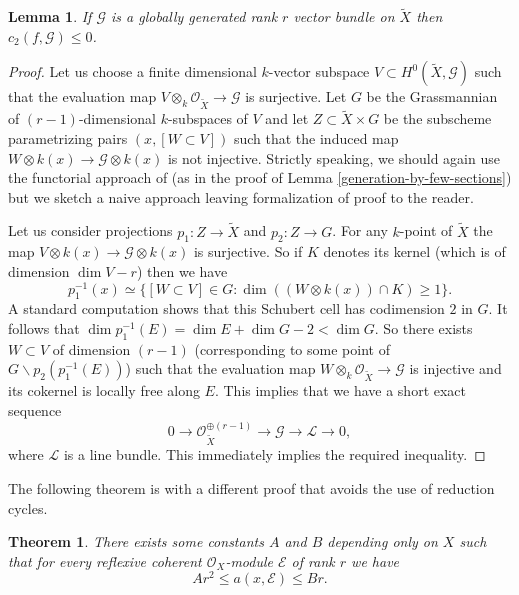 \documentclass[twoside, 11pt]{article}
\theoremstyle{plain}
\newtheorem{Theorem}[Thm]{\sc Theorem}
\newtheorem{Lemma}[Thm]{\sc Lemma}
\theoremstyle{definition}
\theoremstyle{remark}
\newcommand{\cE}{{\mathcal E}}
\newcommand{\cG}{{\mathcal G}}
\newcommand{\cL}{{\mathcal L}}
\newcommand{\cO}{{\mathcal O}}
\begin{document}
\medskip


\begin{Lemma}\label{c_2-global-gen}
If $\cG$ is a globally generated rank $r$ vector bundle on $\tilde X$ then $c_2(f, \cG)\le 0$.
\end{Lemma}

\begin{proof}
Let us choose a finite dimensional $k$-vector subspace $V\subset H^0(\tilde X , \cG)$ such that the evaluation map $V\otimes _k\cO_{\tilde X}\to \cG$ is surjective.
Let $G$ be the Grassmannian of $(r-1)$-dimensional $k$-subspaces of $V$ and let $Z\subset \tilde X\times G$ be the subscheme parametrizing pairs $(x,[W\subset V])$ such that the induced map $W\otimes k(x)\to \cG\otimes k(x)$ is not injective. Strictly speaking, we should again use the functorial approach of \cite{Kl} (as in the proof of Lemma \ref{generation-by-few-sections}) but we sketch a naive approach leaving formalization of proof to the reader.

 Let us consider projections $p_1: Z\to \tilde X$ and $p_2: Z\to G$.
For any $k$-point of $\tilde X$ the map $ V\otimes k(x)\to \cG\otimes k(x) $ is surjective. So if $K$ denotes its kernel (which is of dimension $\dim V-r$) then we have
$$p_1^{-1}(x)\simeq \{ [W\subset V]\in G: \dim ((W\otimes k(x))\cap K)\ge 1\} .$$
A standard computation shows that this Schubert cell has 
codimension $2$ in $G$. It follows that $\dim 
p_1^{-1} (E)=\dim E+\dim G-2 <\dim G$. So there exists $W\subset V$ of dimension $(r-1)$ 
(corresponding to some point of $G\backslash p_2(p_1^{-1} (E))$) such that the evaluation map $W\otimes _k\cO_{\tilde X}\to \cG$ is injective and its cokernel is locally free along $E$. 
This implies that we have a short exact sequence
$$0\to \cO_{\tilde X} ^{\oplus (r-1)}\to \cG \to \cL \to 0,$$
where $\cL$ is a line bundle.
This immediately implies the required inequality.
\end{proof}


\medskip

The following theorem is \cite[Corollary 4.13]{La0} with a different proof that avoids the use of reduction cycles.

\begin{Theorem}\label{bound-on-a(x,E)}
	There exists some constants $A$ and $B$ depending only on $X$ such that for every 
	reflexive coherent $\cO_X$-module  $\cE$ of rank $r$ we have
	$$A r^2\le  a(x, \cE) \le Br.$$
\end{Theorem}
\end{document}
